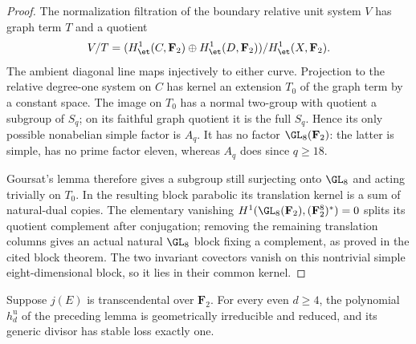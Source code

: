 \begin{proof}
The normalization filtration of the boundary relative unit
system $V$ has graph term $T$ and a quotient
\[
 V/T=(H^1_{\et}(C,\mathbf F_2)\oplus
          H^1_{\et}(D,\mathbf F_2))/H^1_{\et}(X,\mathbf F_2).
\]
The ambient diagonal line maps injectively to either curve.
Projection to the relative degree-one system on $C$ has
kernel an extension $T_0$ of the graph term by a constant
space. The image on $T_0$ has a normal two-group with quotient
a subgroup of $S_q$; on its faithful graph quotient it is the
full $S_q$. Hence its only possible nonabelian simple factor
is $A_q$. It has no factor $\GL_8(\mathbf F_2)$: the latter
is simple, has no prime factor eleven, whereas $A_q$ does
since $q\ge18$.

Goursat's lemma therefore gives a subgroup still surjecting
onto $\GL_8$ and acting trivially on $T_0$. In the resulting
block parabolic its translation kernel is a sum of natural-dual
copies. The elementary vanishing
$H^1(\GL_8(\mathbf F_2),(\mathbf F_2^8)^*)=0$
splits its quotient complement after conjugation; removing
the remaining translation columns gives an actual natural
$\GL_8$ block fixing a complement, as proved in the cited
block theorem. The two invariant covectors vanish on this
nontrivial simple eight-dimensional block, so it lies in their
common kernel.
\end{proof}

\begin{lemma}
\label{lem:generic-mixed-even-Hasse-candidate}
Suppose $j(E)$ is transcendental over $\mathbf F_2$.
For every even $d\ge4$, the polynomial $h_d^{\mathrm u}$ of
the preceding lemma is geometrically irreducible and reduced,
and its generic divisor has stable loss exactly one.
\end{lemma}

